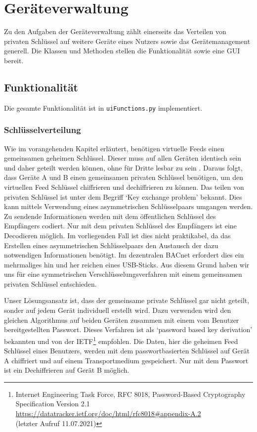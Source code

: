 \documentclass[a4paper,titlepage]{article}
\newcommand{\ilc}[1]{\textcolor{codeColor}{\texttt{#1}}}
\begin{document}
\section{Geräteverwaltung}
Zu den Aufgaben der Geräteverwaltung zählt einerseits das Verteilen von privaten Schlüssel auf weitere Geräte eines Nutzers sowie das Gerätemanagement generell.  Die Klassen und Methoden stellen die Funktionalität sowie eine GUI bereit.

\subsection{Funktionalität}
Die gesamte Funktionalität ist in \ilc{uiFunctions.py} implementiert. 

\subsubsection*{Schlüsselverteilung}
Wie im vorangehenden Kapitel erläutert, benötigen virtuelle Feeds einen gemeinsamen geheimen Schlüssel. Dieser muss auf allen Geräten identisch sein und daher geteilt werden können, ohne für Dritte lesbar zu sein . Daraus folgt, dass Geräte A und B einen gemeinsamen privaten Schlüssel benötigen, um den virtuellen Feed Schlüssel chiffrieren und dechiffrieren zu können.  Das teilen von privaten Schlüssel ist unter dem Begriff `Key exchange problem' bekannt. Dies kann mittels Verwendung eines asymmetrischen Schlüsselpaars umgangen werden. Zu sendende Informationen werden mit dem öffentlichen Schlüssel des Empfängers codiert. Nur mit dem privaten Schlüssel des Empfängers ist eine Decodieren möglich. Im vorliegenden Fall ist dies nicht praktikabel, da das Erstellen eines asymmetrischen Schlüsselpaars den Austausch der dazu notwendigen Informationen benötigt. Im dezentralen BACnet erfordert dies ein mehrmaliges hin und her reichen eines USB-Sticks. Aus diesem Grund haben wir uns für eine symmetrischen Verschlüsselungsverfahren mit einem gemeinsamen privaten Schlüssel entschieden. 

Unser Lösungsansatz ist, dass der gemeinsame private Schlüssel gar nicht geteilt, sonder auf jedem Gerät individuell erstellt wird. Dazu verwenden wird den gleichen Algorithmus auf beiden Geräten zusammen mit einem vom Benutzer bereitgestellten Passwort. Dieses Verfahren ist als `password based key derivation' bekannten und von der IETF\footnote{Internet Engineering Task Force, RFC 8018, Password-Based Cryptography Specification Version 2.1\\ \url{https://datatracker.ietf.org/doc/html/rfc8018\#appendix-A.2} \\ (letzter Aufruf 11.07.2021)} empfohlen. Die Daten, hier die geheimen Feed Schlüssel eines Benutzers, werden mit dem passwortbasierten Schlüssel auf Gerät A chiffriert und auf einem Transportmedium gespeichert. Nur mit dem Passwort ist ein Dechiffrieren auf Gerät B möglich.
\end{document}
